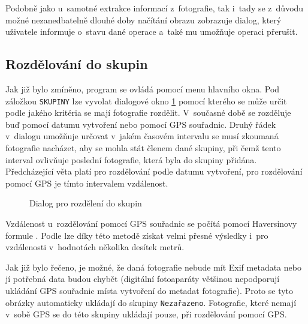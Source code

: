 Podobně jako u~samotné extrakce informací z~fotografie, tak i~tady se z~důvodu možné nezanedbatelně dlouhé doby načítání obrazu zobrazuje dialog, který uživatele informuje o~stavu dané operace a~také mu umožňuje operaci přerušit.

\subsection*{Rozdělování do skupin}

Jak již bylo zmíněno, program se ovládá pomocí menu hlavního okna. Pod záložkou \texttt{SKUPINY} lze vyvolat dialogové okno \ref{Dialog_Skupiny} pomocí kterého se může určit podle jakého kritéria se mají fotografie rozdělit. 
V~současné době se rozděluje buď pomocí datumu vytvoření nebo pomocí GPS souřadnic. Druhý řádek v~dialogu umožňuje určovat v~jakém časovém intervalu se musí zkoumaná fotografie nacházet, aby se mohla stát členem dané skupiny, při čemž tento interval ovlivňuje poslední fotografie, která byla do skupiny přidána. Předcházející věta platí pro rozdělování podle datumu vytvoření, pro rozdělování pomocí GPS je tímto intervalem vzdálenost.

\begin{figure}[h]
\begin{center}
\caption{Dialog pro rozdělení do skupin}
\label{Dialog_Skupiny}
\end{center}
\end{figure}

Vzdálenost u~rozdělování pomocí GPS souřadnic se počítá pomocí Haversinovy formule \cite{Haversine}. Podle \cite{WHYHaversine} lze díky této metodě získat velmi přesné výsledky i~pro vzdálenosti v~hodnotách několika desítek metrů.

Jak již bylo řečeno, je možné, že daná fotografie nebude mít Exif metadata nebo jí potřebná data budou chybět (digitální fotoaparáty většinou nepodporují ukládání GPS souřadnic místa vytvoření do metadat fotografie). Proto se tyto obrázky automaticky ukládají do skupiny \texttt{Nezařazeno}. Fotografie, které nemají v~sobě GPS se do této skupiny ukládají pouze, při rozdělování pomocí GPS.

